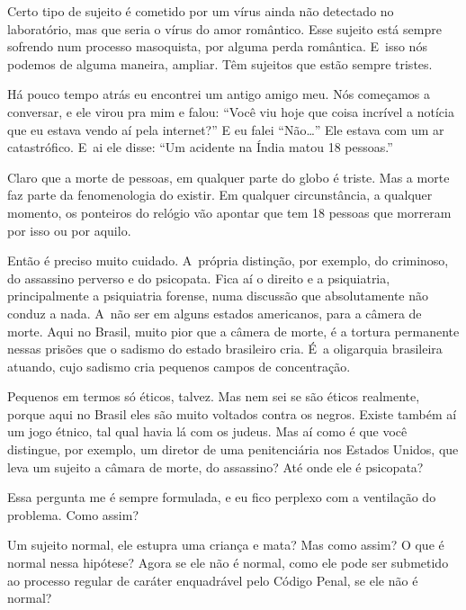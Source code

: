  

Certo tipo de sujeito é cometido por um vírus ainda não detectado no
laboratório, mas que seria o vírus do amor romântico. Esse sujeito
está sempre sofrendo num processo masoquista, por alguma perda
romântica. E~isso nós podemos de alguma maneira, ampliar. Têm
sujeitos que estão sempre tristes.

 

Há pouco tempo atrás eu encontrei um antigo amigo meu. Nós começamos a
conversar, e ele virou pra mim e falou: ``Você viu hoje que coisa
incrível a notícia que eu estava vendo aí pela internet?'' E eu falei
``Não…'' Ele estava com um ar catastrófico. E~ai ele disse: ``Um
acidente na Índia matou 18 pessoas.''

 

Claro que a morte de pessoas, em qualquer parte do globo é triste. Mas
a morte faz parte da fenomenologia do existir. Em qualquer
circunstância, a qualquer momento, os ponteiros do relógio vão apontar
que tem 18 pessoas que morreram por isso ou por aquilo.

 

Então é preciso muito cuidado. A~própria distinção, por exemplo, do
criminoso, do assassino perverso e do psicopata. Fica aí o direito e a
psiquiatria, principalmente a psiquiatria forense, numa discussão que
absolutamente não conduz a nada. A~não ser em alguns estados americanos,
para a câmera de morte. Aqui no Brasil, muito pior que a câmera de
morte, é a tortura permanente nessas prisões que o sadismo do estado
brasileiro cria. É~a oligarquia brasileira atuando, cujo sadismo cria
pequenos campos de concentração.

 

Pequenos em termos só éticos, talvez. Mas nem sei se são éticos
realmente, porque aqui no Brasil eles são muito voltados contra os
negros. Existe também aí um jogo étnico, tal qual havia lá com os
judeus. Mas aí como é que você distingue, por exemplo, um diretor de uma
penitenciária nos Estados Unidos, que leva um sujeito a câmara de morte,
do assassino? Até onde ele é psicopata?

 

Essa pergunta me é sempre formulada, e eu fico perplexo com a ventilação
do problema. Como assim?

 

Um sujeito normal, ele estupra uma criança e mata? Mas como assim? O que
é normal nessa hipótese? Agora se ele não é normal, como ele pode ser
submetido ao processo regular de caráter enquadrável pelo Código Penal,
se ele não é normal?

